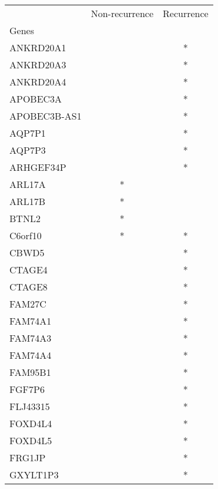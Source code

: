 \begin{tabular}{lcc}
\toprule
{} & Non-recurrence & Recurrence \\
Genes              &                &            \\
\midrule
ANKRD20A1          &                &          * \\
ANKRD20A3          &                &          * \\
ANKRD20A4          &                &          * \\
APOBEC3A           &                &          * \\
APOBEC3B-AS1       &                &          * \\
AQP7P1             &                &          * \\
AQP7P3             &                &          * \\
ARHGEF34P          &                &          * \\
ARL17A             &              * &            \\
ARL17B             &              * &            \\
BTNL2              &              * &            \\
C6orf10            &              * &          * \\
CBWD5              &                &          * \\
CTAGE4             &                &          * \\
CTAGE8             &                &          * \\
FAM27C             &                &          * \\
FAM74A1            &                &          * \\
FAM74A3            &                &          * \\
FAM74A4            &                &          * \\
FAM95B1            &                &          * \\
FGF7P6             &                &          * \\
FLJ43315           &                &          * \\
FOXD4L4            &                &          * \\
FOXD4L5            &                &          * \\
FRG1JP             &                &          * \\
GXYLT1P3           &                &          * \\

\end{tabular}
